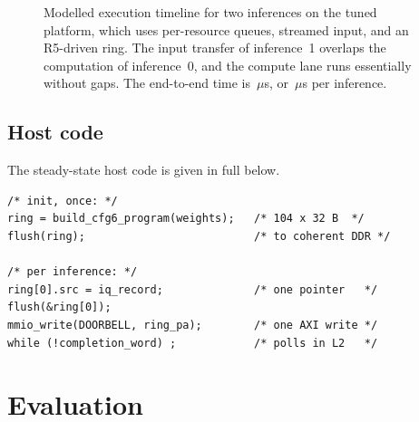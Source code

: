 \documentclass[twocolumn,10pt]{article}
\begin{document}
\begin{figure}[t]
\centering
{}
\caption{Modelled execution timeline for two inferences on the tuned platform,
which uses per-resource queues, streamed input, and an R5-driven ring.  The
input transfer of inference~1 overlaps the computation of inference~0, and the
compute lane runs essentially without gaps.  The end-to-end time is
\TimelineEnd\,$\mu$s, or \TimelineTwoPerInf\,$\mu$s per inference.}
\label{fig:timeline}
\end{figure}

\subsection{Host code}
The steady-state host code is given in full below.
\begin{lstlisting}
/* init, once: */
ring = build_cfg6_program(weights);   /* 104 x 32 B  */
flush(ring);                          /* to coherent DDR */

/* per inference: */
ring[0].src = iq_record;              /* one pointer   */
flush(&ring[0]);
mmio_write(DOORBELL, ring_pa);        /* one AXI write */
while (!completion_word) ;            /* polls in L2   */
\end{lstlisting}

\section{Evaluation}\label{sec:eval}
\end{document}
